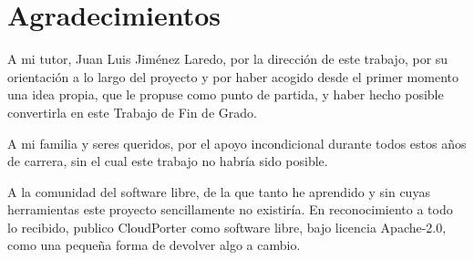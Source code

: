 \chapter*{Agradecimientos}

A mi tutor, Juan Luis Jiménez Laredo, por la dirección de este trabajo, por su
orientación a lo largo del proyecto y por haber acogido desde el primer momento una idea propia,
que le propuse como punto de partida, y haber hecho posible convertirla en este Trabajo de Fin
de Grado.

A mi familia y seres queridos, por el apoyo incondicional durante todos estos años de carrera, sin el cual este
trabajo no habría sido posible.

A la comunidad del software libre, de la que tanto he aprendido y sin cuyas herramientas
este proyecto sencillamente no existiría. En reconocimiento a todo lo recibido, publico
CloudPorter como software libre, bajo licencia Apache-2.0, como una pequeña forma de
devolver algo a cambio.
